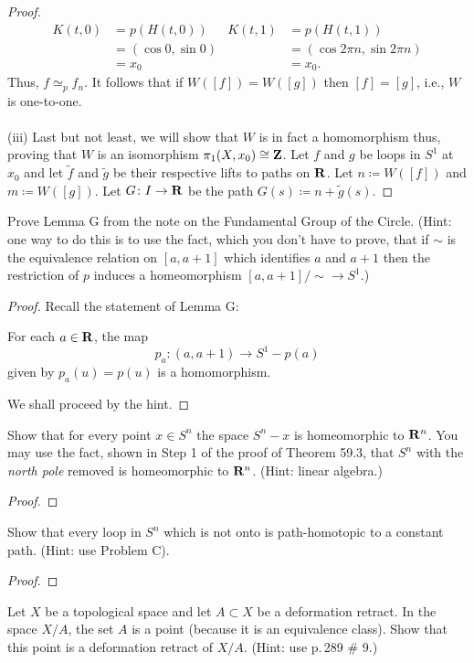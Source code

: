 \begin{proof}
\begin{align*}
K(t,0)&=p(H(t,0))&
K(t,1)&=p(H(t,1))\\
&=(\cos 0,\sin 0)&
&=(\cos 2\pi n,\sin 2\pi n)\\
&=x_0&
&=x_0.
\end{align*}
Thus, $f\simeq_p f_n$. It follows that if $W([f])=W([g])$ then $[f]=[g]$,
i.e., $W$ is one-to-one.
\\\\
(iii) Last but not least, we will show that $W$ is in fact a homomorphism
thus, proving that $W$ is an isomorphism $\pi_1(X,x_0)\cong\mathbf{Z}$. Let $f$
and $g$ be loops in $S^1$ at $x_0$ and let $\tilde f$ and $\tilde g$ be
their respective lifts to paths on $\mathbf{R}$. Let $n\coloneqq W([f])$ and
$m\coloneqq W([g])$. Let $G\colon I\to\mathbf{R}$ be the path $G(s)\coloneqq
n+\tilde g(s)$.
\end{proof}
\newpage
\begin{problem}[(B)]
Prove Lemma G from the note on the Fundamental Group of the Circle. (Hint:
one way to do this is to use the fact, which you don’t have to prove, that
if $\sim$ is the equivalence relation on $[a,a+1]$ which identifies $a$ and
$a+1$ then the restriction of $p$ induces a homeomorphism
$[a,a+1]/{\sim}\to S^1$.)
\end{problem}
\begin{proof}
Recall the statement of Lemma G:
\begin{lemma*}[G]
For each $a\in\mathbf{R}$, the map
\[
p_a\colon(a,a+1)\longrightarrow S^1-p(a)
\]
given by $p_a(u)=p(u)$ is a homomorphism.
\end{lemma*}
We shall proceed by the hint.
\end{proof}
\newpage
\begin{problem}[(C)]
Show that for every point $x\in S^n$ the space $S^n-x$ is homeomorphic to
$\mathbf{R}^n$. You may use the fact, shown in Step 1 of the proof of Theorem
59.3, that $S^n$ with the \emph{north pole} removed is homeomorphic to
$\mathbf{R}^n$. (Hint: linear algebra.)
\end{problem}
\begin{proof}
\end{proof}
\newpage
\begin{problem}[(D)]
Show that every loop in $S^n$ which is not onto is path-homotopic to a
constant path. (Hint: use Problem C).
\end{problem}
\begin{proof}
\end{proof}
\newpage
\begin{problem}[(E)]
Let $X$ be a topological space and let $A\subset X$ be a deformation
retract. In the space $X/A$, the set $A$ is a point (because it is an
equivalence class). Show that this point is a deformation retract of
$X/A$. (Hint: use p.\,289 \# 9.)
\end{problem}
